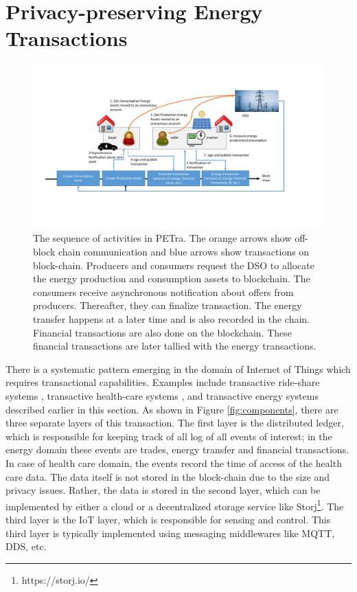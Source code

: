 

\section{Privacy-preserving Energy Transactions}
\label{sec:petra}
\begin{figure}[ht]
\centering
\includegraphics[width=\textwidth]{petra.pdf}
\caption{The sequence of activities in PETra. The orange arrows show off-block chain communication and blue arrows show transactions on block-chain. Producers and consumers request the DSO to allocate the energy production and consumption assets to blockchain. The consumers receive asynchronous notification about offers from producers. Thereafter, they can finalize transaction. The energy transfer happens at a later time and is also recorded in the chain. Financial transactions are also done on the blockchain. These financial transactions are later tallied with the energy transactions.}\label{fig:petrasequence}
\end{figure}

There is a systematic pattern emerging in the domain of Internet of Things which requires transactional capabilities. Examples include transactive ride-share systems \cite{yuan2016towards}, transactive health-care systems \cite{azaria2016medrec}, and transactive energy systems described earlier in this section. As shown in Figure \ref{fig:components}, there are three separate layers of this transaction. The first layer is the distributed ledger, which is responsible for keeping track of all log of all events of interest; in the energy domain these events are trades, energy transfer and financial transactions. In case of health care domain, the events record the time of access of the health care data. The data itself is not stored in the block-chain due to the size and privacy issues. Rather, the data is stored in the second layer, which can be implemented by either a cloud or a decentralized storage service like Storj\footnote{https://storj.io/}. The third layer is the IoT layer, which is responsible for sensing and control. This third layer is typically implemented using messaging middlewares like MQTT, DDS, etc. 

